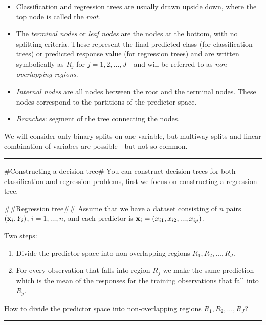 \documentclass[]{article}
\providecommand{\tightlist}{%
  \setlength{\itemsep}{0pt}\setlength{\parskip}{0pt}}
\begin{document}
\begin{itemize}
\tightlist
\item
  Classification and regression trees are usually drawn upside down,
  where the top node is called the \emph{root}.
\item
  The \emph{terminal nodes} or \emph{leaf nodes} are the nodes at the
  bottom, with no splitting criteria. These represent the final
  predicted class (for classification trees) or predicted response value
  (for regression trees) and are written symbolically as \(R_j\) for
  \(j = 1, 2, ..., J\) - and will be referred to as
  \emph{non-overlapping regions}.
\item
  \emph{Internal nodes} are all nodes between the root and the terminal
  nodes. These nodes correspond to the partitions of the predictor
  space.
\item
  \emph{Branches}: segment of the tree connecting the nodes.
\end{itemize}

We will consider only binary splits on one variable, but multiway splits
and linear combination of variabes are possible - but not so common.

\begin{center}\rule{0.5\linewidth}{\linethickness}\end{center}

\#Constructing a decision tree\# You can construct decision trees for
both classification and regression problems, first we focus on
constructing a regression tree.

\#\#Regression tree\#\# Assume that we have a dataset consisting of
\(n\) pairs \(({\bf x}_i,Y_i)\), \(i=1,\ldots,n\), and each predictor is
\({\bf x}_i=(x_{i1},x_{i2},...,x_{ip})\).

Two steps:

\begin{enumerate}
\def\labelenumi{\arabic{enumi}.}
\tightlist
\item
  Divide the predictor space into non-overlapping regions
  \(R_1,R_2,\ldots,R_J\).
\item
  For every observation that falls into region \(R_j\) we make the same
  prediction - which is the mean of the responses for the training
  observations that fall into \(R_j\).
\end{enumerate}

How to divide the predictor space into non-overlapping regions
\(R_1,R_2,\ldots,R_J\)?

\begin{center}\rule{0.5\linewidth}{\linethickness}\end{center}
\end{document}
